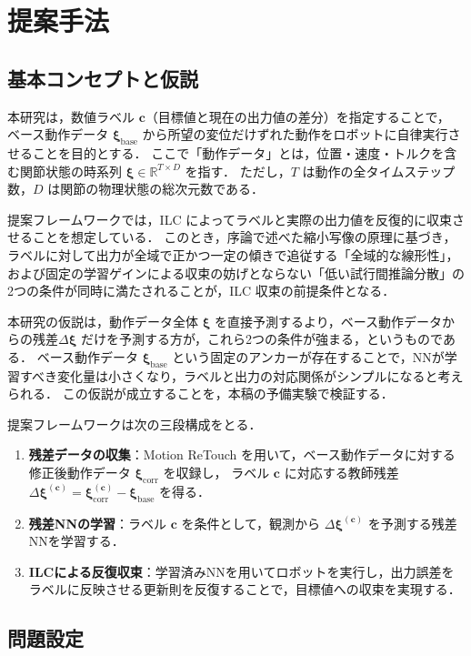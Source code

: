 \section{提案手法}
\label{sec:method}

\subsection{基本コンセプトと仮説}

本研究は，数値ラベル $\bm{c}$（目標値と現在の出力値の差分）を指定することで，
ベース動作データ $\bm{\xi}_\text{base}$ から所望の変位だけずれた動作をロボットに自律実行させることを目的とする．
ここで「動作データ」とは，位置・速度・トルクを含む関節状態の時系列 $\bm{\xi} \in \mathbb{R}^{T \times D}$ を指す．
ただし，$T$ は動作の全タイムステップ数，$D$ は関節の物理状態の総次元数である．

提案フレームワークでは，ILC によってラベルと実際の出力値を反復的に収束させることを想定している．
このとき，序論で述べた縮小写像の原理に基づき，ラベルに対して出力が全域で正かつ一定の傾きで追従する「全域的な線形性」，および固定の学習ゲインによる収束の妨げとならない「低い試行間推論分散」の2つの条件が同時に満たされることが，ILC 収束の前提条件となる．

本研究の仮説は，動作データ全体 $\bm{\xi}$ を直接予測するより，ベース動作データからの残差$\Delta\bm{\xi}$ だけを予測する方が，これら2つの条件が強まる，というものである．
ベース動作データ $\bm{\xi}_\text{base}$ という固定のアンカーが存在することで，NNが学習すべき変化量は小さくなり，ラベルと出力の対応関係がシンプルになると考えられる．
この仮説が成立することを，本稿の予備実験で検証する．

提案フレームワークは次の三段構成をとる．
\begin{enumerate}
  \item \textbf{残差データの収集}：Motion ReTouch \cite{Inami2025} を用いて，ベース動作データに対する修正後動作データ $\bm{\xi}_\text{corr}$ を収録し， ラベル $\bm{c}$ に対応する教師残差 $\Delta\bm{\xi}^{(\bm{c})} = \bm{\xi}^{(\bm{c})}_\text{corr} - \bm{\xi}_\text{base}$ を得る．
  \item \textbf{残差NNの学習}：ラベル $\bm{c}$ を条件として，観測から $\Delta\bm{\xi}^{(\bm{c})}$ を予測する残差NNを学習する．
  \item \textbf{ILCによる反復収束}：学習済みNNを用いてロボットを実行し，出力誤差をラベルに反映させる更新則を反復することで，目標値への収束を実現する．
\end{enumerate}

\subsection{問題設定}

